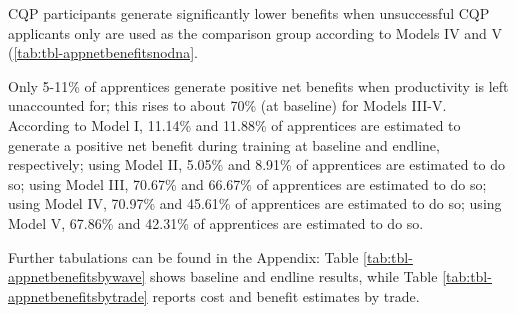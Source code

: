 \documentclass[
  11pt,
a4paper
]{article}
\begin{document}
CQP participants generate significantly lower benefits when unsuccessful CQP applicants only are used as the comparison group according to Models IV and V (\ref{tab:tbl-appnetbenefitsnodna}.

Only 5-11\% of apprentices generate positive net benefits when productivity is left unaccounted for; this rises to about 70\% (at baseline) for Models III-V. According to Model I, 11.14\% and 11.88\% of apprentices are estimated to generate a positive net benefit during training at baseline and endline, respectively; using Model II, 5.05\% and 8.91\% of apprentices are estimated to do so; using Model III, 70.67\% and 66.67\% of apprentices are estimated to do so; using Model IV, 70.97\% and 45.61\% of apprentices are estimated to do so; using Model V, 67.86\% and 42.31\% of apprentices are estimated to do so.

Further tabulations can be found in the Appendix: Table \ref{tab:tbl-appnetbenefitsbywave} shows baseline and endline results, while Table \ref{tab:tbl-appnetbenefitsbytrade} reports cost and benefit estimates by trade.
\end{document}
